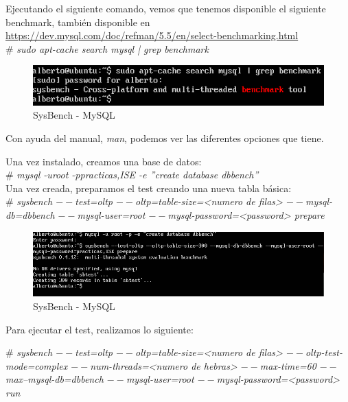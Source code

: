 Ejecutando el siguiente comando, vemos que tenemos disponible el siguiente benchmark, también disponible en \url{https://dev.mysql.com/doc/refman/5.5/en/select-benchmarking.html} \\
\# \textit{sudo apt-cache search mysql | grep benchmark} \\


\begin{figure}[h]
	\centering
	\includegraphics[scale=0.5]{images/sysbench1.png}
	\caption{SysBench - MySQL}
\end{figure} 

Con ayuda del manual, \textit{man}, podemos ver las diferentes opciones que tiene.

Una vez instalado, creamos una base de datos: \\

\# \textit{mysql -uroot -ppracticas,ISE -e ''create database dbbench''} \\

Una vez creada, preparamos el test creando una nueva tabla básica: \\

\# \textit{sysbench $--$test=oltp $--$oltp=table-size=<numero de filas> $--$mysql-db=dbbench $--$mysql-user=root $--$mysql-password=<password> prepare} \\


\begin{figure}[h]
	\centering
	\includegraphics[scale=0.5]{images/sysbench3.png}
	\caption{SysBench - MySQL}
\end{figure}

\newpage
Para ejecutar el test, realizamos lo siguiente:

\# \textit{sysbench $--$test=oltp $--$oltp=table-size=<numero de filas> $--$oltp-test-mode=complex $--$num-threads=<numero de hebras> $--$max-time=60 $--$max--mysql-db=dbbench $--$mysql-user=root $--$mysql-password=<password> run} \\

